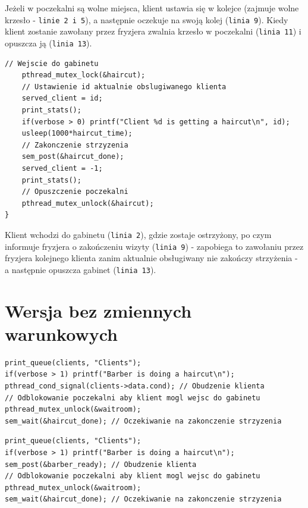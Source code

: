 \documentclass[12pt,a4paper]{article}
\begin{document}
	Jeżeli w poczekalni są wolne miejsca, klient ustawia się w kolejce
	(zajmuje wolne krzesło - \texttt{linie 2 i 5}), a następnie oczekuje
	na swoją kolej (\texttt{linia 9}). Kiedy klient zostanie zawołany
	przez fryzjera zwalnia krzesło w poczekalni (\texttt{linia 11}) i
	opuszcza ją (\texttt{linia 13}).
	
	\begin{center}
		\begin{minipage}{0.8\linewidth}
\begin{lstlisting}[caption = Funkcja klienta 3/3.]
// Wejscie do gabinetu
    pthread_mutex_lock(&haircut);
    // Ustawienie id aktualnie obslugiwanego klienta
    served_client = id;
    print_stats();
    if(verbose > 0) printf("Client %d is getting a haircut\n", id);
    usleep(1000*haircut_time);
    // Zakonczenie strzyzenia
    sem_post(&haircut_done);
    served_client = -1;
    print_stats();
    // Opuszczenie poczekalni
    pthread_mutex_unlock(&haircut);
}
\end{lstlisting}
		\end{minipage}
	\end{center}
	
	Klient wchodzi do gabinetu (\texttt{linia 2}), gdzie zostaje
	ostrzyżony, po czym informuje fryzjera o zakończeniu wizyty
	(\texttt{linia 9}) - zapobiega to zawołaniu przez fryzjera kolejnego
	klienta zanim aktualnie obsługiwany nie zakończy strzyżenia - a 
	następnie opuszcza gabinet (\texttt{linia 13}).
	
		\section{Wersja bez zmiennych warunkowych}

	\begin{center}
		\begin{minipage}{0.8\linewidth}
\begin{lstlisting}[caption = Fryzjer ze zmiennymi warunkowymi.]
print_queue(clients, "Clients");
if(verbose > 1) printf("Barber is doing a haircut\n");
pthread_cond_signal(clients->data.cond); // Obudzenie klienta
// Odblokowanie poczekalni aby klient mogl wejsc do gabinetu
pthread_mutex_unlock(&waitroom);
sem_wait(&haircut_done); // Oczekiwanie na zakonczenie strzyzenia
\end{lstlisting}
		\end{minipage}
	\end{center}

\begin{center}
		\begin{minipage}{0.8\linewidth}
\begin{lstlisting}[caption = Fryzjer bez zmiennych warunkowych.]
print_queue(clients, "Clients");
if(verbose > 1) printf("Barber is doing a haircut\n");
sem_post(&barber_ready); // Obudzenie klienta
// Odblokowanie poczekalni aby klient mogl wejsc do gabinetu
pthread_mutex_unlock(&waitroom);
sem_wait(&haircut_done); // Oczekiwanie na zakonczenie strzyzenia
\end{lstlisting}
		\end{minipage}
	\end{center}
	
\end{document}
